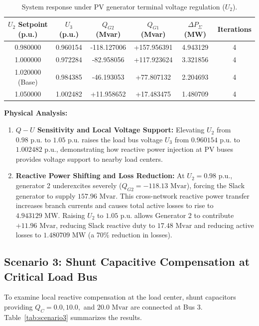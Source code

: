 \documentclass[12pt,a4paper,oneside]{report}
\begin{document}
\begin{table}[H]
\centering
\caption{System response under PV generator terminal voltage regulation ($U_2$).}
\label{tab:scenario2}
\begin{tabular}{cccccc}
\toprule
\textbf{$U_2$ Setpoint (p.u.)} & \textbf{$U_3$ (p.u.)} & \textbf{$Q_{G2}$ (Mvar)} & \textbf{$Q_{G1}$ (Mvar)} & \textbf{$\Delta P_{\Sigma}$ (MW)} & \textbf{Iterations} \\
\midrule
0.980000 & 0.960154 & -118.127006 & +157.956391 & 4.943129 & 4 \\
1.000000 & 0.972284 & -82.958056 & +117.923624 & 3.321856 & 4 \\
1.020000 (Base) & 0.984385 & -46.193053 & +77.807132 & 2.204693 & 4 \\
1.050000 & 1.002482 & +11.958652 & +17.483475 & 1.480709 & 4 \\
\bottomrule
\end{tabular}
\end{table}

\textbf{Physical Analysis:}
\begin{enumerate}
    \item \textbf{$Q-U$ Sensitivity and Local Voltage Support:} Elevating $U_2$ from $0.98\text{ p.u.}$ to $1.05\text{ p.u.}$ raises the load bus voltage $U_3$ from $0.960154\text{ p.u.}$ to $1.002482\text{ p.u.}$, demonstrating how reactive power injection at PV buses provides voltage support to nearby load centers.
    \item \textbf{Reactive Power Shifting and Loss Reduction:} At $U_2 = 0.98\text{ p.u.}$, generator 2 underexcites severely ($Q_{G2} = -118.13\text{ Mvar}$), forcing the Slack generator to supply $157.96\text{ Mvar}$. This cross-network reactive power transfer increases branch currents and causes total active losses to rise to $4.943129\text{ MW}$. Raising $U_2$ to $1.05\text{ p.u.}$ allows Generator 2 to contribute $+11.96\text{ Mvar}$, reducing Slack reactive duty to $17.48\text{ Mvar}$ and reducing active losses to $1.480709\text{ MW}$ (a 70\% reduction in losses).
\end{enumerate}

\subsection{Scenario 3: Shunt Capacitive Compensation at Critical Load Bus}
To examine local reactive compensation at the load center, shunt capacitors providing $Q_C = 0.0, 10.0,$ and $20.0\text{ Mvar}$ are connected at Bus 3. Table~\ref{tab:scenario3} summarizes the results.
\end{document}
